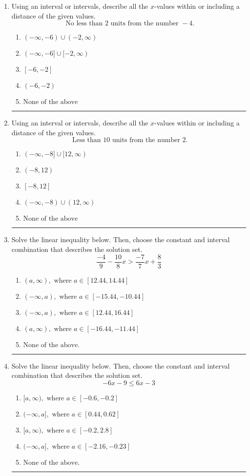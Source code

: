 \documentclass[14pt]{extbook}
\newcommand{\litem}[1]{\item#1\hspace*{-1cm}\rule{\textwidth}{0.4pt}}
\begin{document}
\begin{enumerate}
{\begin{enumerate}[label=\Alph*.]
\end{enumerate} }
\litem{
Using an interval or intervals, describe all the $x$-values within or including a distance of the given values.\[ \text{ No less than } 2 \text{ units from the number } -4. \]\begin{enumerate}[label=\Alph*.]
\item \( (-\infty, -6) \cup (-2, \infty) \)
\item \( (-\infty, -6] \cup [-2, \infty) \)
\item \( [-6, -2] \)
\item \( (-6, -2) \)
\item \( \text{None of the above} \)

\end{enumerate} }
\litem{
Using an interval or intervals, describe all the $x$-values within or including a distance of the given values.\[ \text{ Less than } 10 \text{ units from the number } 2. \]\begin{enumerate}[label=\Alph*.]
\item \( (-\infty, -8] \cup [12, \infty) \)
\item \( (-8, 12) \)
\item \( [-8, 12] \)
\item \( (-\infty, -8) \cup (12, \infty) \)
\item \( \text{None of the above} \)

\end{enumerate} }
\litem{
Solve the linear inequality below. Then, choose the constant and interval combination that describes the solution set.\[ \frac{-4}{9} - \frac{10}{8} x > \frac{-7}{7} x + \frac{8}{3} \]\begin{enumerate}[label=\Alph*.]
\item \( (a, \infty), \text{ where } a \in [12.44, 14.44] \)
\item \( (-\infty, a), \text{ where } a \in [-15.44, -10.44] \)
\item \( (-\infty, a), \text{ where } a \in [12.44, 16.44] \)
\item \( (a, \infty), \text{ where } a \in [-16.44, -11.44] \)
\item \( \text{None of the above}. \)

\end{enumerate} }
\litem{
Solve the linear inequality below. Then, choose the constant and interval combination that describes the solution set.\[ -6x -9 \leq 6x -3 \]\begin{enumerate}[label=\Alph*.]
\item \( [a, \infty), \text{ where } a \in [-0.6, -0.2] \)
\item \( (-\infty, a], \text{ where } a \in [0.44, 0.62] \)
\item \( [a, \infty), \text{ where } a \in [-0.2, 2.8] \)
\item \( (-\infty, a], \text{ where } a \in [-2.16, -0.23] \)
\item \( \text{None of the above}. \)

\end{enumerate} }
\end{enumerate}
\end{document}
